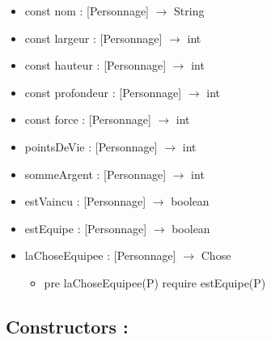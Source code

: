 \documentclass[11pt]{article}
\begin{document}
\begin{itemize}

\item const nom : [Personnage] $\to$ String\\
\label{sec-1.4.1.1}


\item const largeur : [Personnage] $\to$ int\\
\label{sec-1.4.1.2}


\item const hauteur : [Personnage] $\to$ int\\
\label{sec-1.4.1.3}


\item const profondeur : [Personnage] $\to$ int\\
\label{sec-1.4.1.4}


\item const force : [Personnage] $\to$ int\\
\label{sec-1.4.1.5}


\item pointsDeVie : [Personnage] $\to$ int\\
\label{sec-1.4.1.6}


\item sommeArgent : [Personnage] $\to$ int\\
\label{sec-1.4.1.7}


\item estVaincu : [Personnage] $\to$ boolean\\
\label{sec-1.4.1.8}


\item estEquipe : [Personnage] $\to$ boolean\\
\label{sec-1.4.1.9}


\item laChoseEquipee : [Personnage] $\to$ Chose\\
\label{sec-1.4.1.10}

\begin{itemize}

\item pre laChoseEquipee(P) require estEquipe(P)\\
\label{sec-1.4.1.10.1}


\end{itemize} %
\end{itemize} %
\subsection{Constructors :}
\label{sec-1.5}
\end{document}
